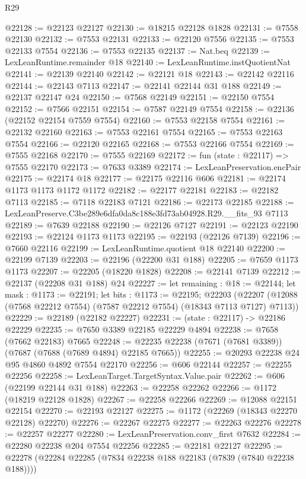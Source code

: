 \begin{lexlean}{R29}
\begin{coremodule}
@22128 := @22123 @22127
@22130 := @18215 @22128 @1828
@22131 := @7558 @22130
@22132 := @7553 @22131
@22133 := @22120 @7556
@22135 := @7553 @22133 @7554
@22136 := @7553 @22135
@22137 := Nat.beq
@22139 := LexLeanRuntime.remainder @18
@22140 := LexLeanRuntime.instQuotientNat
@22141 := @22139 @22140
@22142 := @22121 @18
@22143 := @22142 @22116
@22144 := @22143 @7113
@22147 := @22141 @22144 @31 @188
@22149 := @22137 @22147 @24
@22150 := @7568 @22149
@22151 := @22150 @7554
@22152 := @7566 @22151
@22154 := @7587 @22149 @7554
@22158 := @22136 (@22152 @22154 @7559 @7554)
@22160 := @7553 @22158 @7554
@22161 := @22132 @22160
@22163 := @7553 @22161 @7554
@22165 := @7553 @22163 @7554
@22166 := @22120 @22165
@22168 := @7553 @22166 @7554
@22169 := @7555 @22168
@22170 := @7555 @22169
@22172 := fun (state : @22117) => @7555 @22170
@22173 := @7633 @3389
@22174 := LexLeanPreservation.encPair
@22175 := @22174 @18
@22177 := @22175 @22116 @606
@22181 := @22174 @1173 @1173 @1172 @1172
@22182 := @22177 @22181
@22183 := @22182 @7113
@22185 := @7118 @22183 @7121
@22186 := @22173 @22185
@22188 := LexLeanPreserve.C3be289e6dfa0da8c188e3fd73ab04928.R29.__fits_93 @7113
@22189 := @7639 @22188
@22190 := @22126 @7127
@22191 := @22123 @22190
@22193 := @22124 @1173 @1173
@22195 := @22193 (@22126 @7139)
@22196 := @7660 @22116
@22199 := LexLeanRuntime.quotient @18 @22140
@22200 := @22199 @7139
@22203 := @22196 (@22200 @31 @188)
@22205 := @7659 @1173 @1173
@22207 := @22205 (@18220 @1828)
@22208 := @22141 @7139
@22212 := @22137 (@22208 @31 @188) @24
@22227 := let remaining : @18 := @22144;
  let mask : @1173 := @22191;
  let bits : @1173 := @22195;
  @22203 (@22207 (@12088 (@7568 @22212 @7554) (@7587 @22212 @7554) (@18343 @7113 @7127) @7113))
@22229 := @22189 (@22182 @22227)
@22231 := (state : @22117) -> @22186 @22229
@22235 := @7650 @3389 @22185 @22229 @4894
@22238 := @7658 (@7662 @22183) @7665
@22248 := @22235 @22238 (@7671 (@7681 @3389)) (@7687 (@7688 (@7689 @4894) @22185 @7665))
@22255 := @20293 @22238 @24 @95 @4860 @4892 @7554 @22170
@22256 := @606 @22144
@22257 := @22255 @22256
@22258 := LexLeanTarget.TargetSyntax.Value.pair
@22262 := @606 (@22199 @22144 @31 @188)
@22263 := @22258 @22262
@22266 := @1172 (@18219 @22128 @1828)
@22267 := @22258 @22266
@22269 := @12088 @22151 @22154
@22270 := @22193 @22127
@22275 := @1172 (@22269 (@18343 @22270 @22128) @22270)
@22276 := @22267 @22275
@22277 := @22263 @22276
@22278 := @22257 @22277
@22280 := LexLeanPreservation.conv_first @7632
@22284 := @22280 @22238 @204 @7554 @22256
@22285 := @22181 @22127
@22295 := @22278 (@22284 @22285 (@7834 @22238 @188 @22183 (@7839 (@7840 @22238 @188))))

\end{coremodule}
\end{lexlean}
